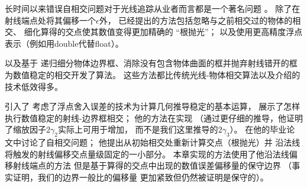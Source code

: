 长时间以来错误自相交问题对于光线追踪从业者而言都是一个著名问题
\citep{10.5555/94788.94790,Amanatides1990:27}。
除了在射线端点处将其偏移一个$\epsilon$外，
已经提出的方法包括忽略与之前相交过的物体的相交、
细化算得的交点使其数值变得更加精确的
“根抛光”\citep{10.5555/94788.94790,536271}；
以及使用更高精度浮点表示（例如用{\ttfamily double}代替{\ttfamily float}）。

\citet{10.1145/74333.74364}以及\citet{4061542}基于
递归细分物体边界框、消除没有包含物体曲面的框并抛弃射线错开的框为数值稳定的相交开发了算法。
这些方法都比传统光线-物体相交算法以及介绍的技术低效得多。

\citet{10.1145/73833.73857}引入了
考虑了浮点舍入误差的技术为计算几何推导稳定的基本运算，
\citet{Ize2013BVH}展示了怎样执行数值稳定的射线-边界框相交；
他的方法在实现
（通过更仔细的推导，他证明了缩放因子$2\gamma_2$实际上可用于增加，
而不是我们这里推导的$2\gamma_3$）。
\citet{Wächter_2008}在他的毕业论文中讨论了自相交问题；
他提出从初始相交处重新计算交点（根抛光）并
沿法线将触发的射线偏移交点量级固定的一小部分。
本章实现的方法使用了他沿法线偏移射线端点的方法
但是基于算得的交点中出现的数值误差偏移量的保守边界
（事实证明，我们的边界一般比\citeauthor{Wächter_2008}的偏移量
更加紧致但仍然被证明是保守的）。
